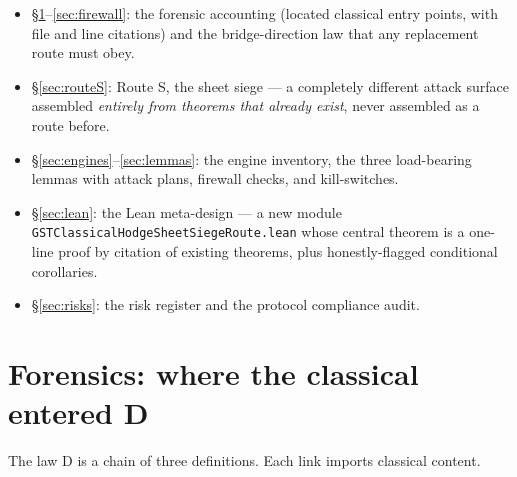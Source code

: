 \documentclass[11pt]{article}
\renewcommand{\_}{\textunderscore\allowbreak}
\begin{document}
\begin{itemize}[leftmargin=2em]
\item \S\ref{sec:forensics}--\ref{sec:firewall}: the forensic accounting
(located classical entry points, with file and line citations) and the
bridge-direction law that any replacement route must obey.
\item \S\ref{sec:routeS}: Route S, the sheet siege --- a completely different
attack surface assembled \emph{entirely from theorems that already exist},
never assembled as a route before.
\item \S\ref{sec:engines}--\ref{sec:lemmas}: the engine inventory, the three
load-bearing lemmas with attack plans, firewall checks, and kill-switches.
\item \S\ref{sec:lean}: the Lean meta-design --- a new module
\texttt{GSTClassicalHodgeSheetSiegeRoute.lean} whose central theorem is a
one-line proof by citation of existing theorems, plus honestly-flagged
conditional corollaries.
\item \S\ref{sec:risks}: the risk register and the protocol compliance audit.
\end{itemize}

\section{Forensics: where the classical entered D}\label{sec:forensics}

The law D is a chain of three definitions. Each link imports classical content.
\end{document}
